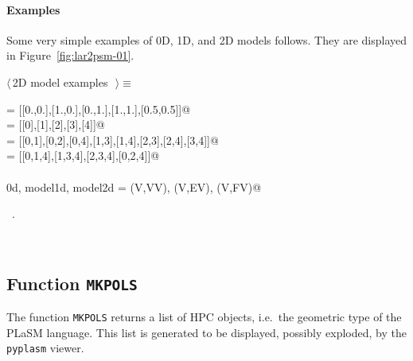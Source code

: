 \documentclass[11pt,oneside]{article}	%
\begin{document}
\paragraph{Examples} 
Some very simple examples of 0D, 1D, and 2D models follows. They are displayed in Figure~\ref{fig:lar2psm-01}.
\begin{flushleft} \small
\begin{minipage}{\linewidth} \label{scrap7}
$\langle\,$2D model examples\nobreak\ {\footnotesize {}}$\,\rangle\equiv$
\vspace{-1ex}
\begin{list}{}{} \item
\mbox{}\verb@V = [[0.,0.],[1.,0.],[0.,1.],[1.,1.],[0.5,0.5]]@\\
\mbox{}\verb@VV = [[0],[1],[2],[3],[4]]@\\
\mbox{}\verb@EV = [[0,1],[0,2],[0,4],[1,3],[1,4],[2,3],[2,4],[3,4]]@\\
\mbox{}\verb@FV = [[0,1,4],[1,3,4],[2,3,4],[0,2,4]]@\\
\mbox{}\verb@@\\
\mbox{}\verb@model0d, model1d, model2d = (V,VV), (V,EV), (V,FV)@\\
\mbox{}\verb@@{\NWsep}
\end{list}
\vspace{-1ex}
\footnotesize\addtolength{\baselineskip}{-1ex}
\begin{list}{}{\setlength{\itemsep}{-\parsep}\setlength{\itemindent}{-\leftmargin}}
\item \NWtxtMacroRefIn\ .
\end{list}
\end{minipage}\\[4ex]
\end{flushleft}

\subsection{Function \texttt{MKPOLS}}

The function \texttt{MKPOLS} returns a list of HPC objects, i.e.~the geometric type of the PLaSM language. This list is generated to be displayed, possibly exploded, by the \texttt{pyplasm} viewer. 
\end{document}
